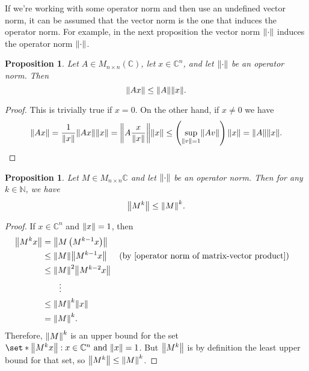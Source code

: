 \documentclass[12pt]{article}
\newtheorem{prop}[thm]{Proposition}
\theoremstyle{definition}
\newcommand{\N}{\mathbb N}
\newcommand{\C}{\mathbb C}
\DeclarePairedDelimiter\norm{\lVert}{\rVert}
\begin{document}
If we're working with some operator norm and then use an undefined vector norm, it can be assumed that the vector norm is the one that induces the operator norm. For example, in the next proposition the vector norm $\norm{\cdot}$ induces the operator norm $\norm{\cdot}$.

\begin{prop}\label{operator norm of matrix-vector product}
Let $A \in M_{n \times n}(\C)$, let $x \in \C^n$, and let $\norm{\cdot}$ be an operator norm. Then $$\norm*{Ax} \leq \norm*{A}\norm*{x}.$$
\end{prop}
\begin{proof}
This is trivially true if $x = 0$. On the other hand, if $x \neq 0$ we have
$$
\norm*{Ax} 
= \frac{1}{\norm{x}} \norm*{Ax} \norm*{x}
= \norm*{A \frac{x}{\norm{x}}} \norm*{x}
\leq \left( \sup_{\norm{v} = 1} \norm{A v} \right) \norm{x}
= \norm{A} \norm{x}.
$$
\end{proof}

\begin{prop}\label{operator norm of matrix power}
Let $M \in M_{n \times n} \C$ and let $\norm{\cdot}$ be an operator norm. Then for any $k \in \N$, we have $$\norm*{M^k} \leq \norm*{M}^k.$$
\end{prop}
\begin{proof}
If $x \in \C^n$ and $\norm{x} = 1$, then
\begin{align*}
\norm*{M^k x} &= \norm*{M\left( M^{k-1} x \right)} \\
&\leq \norm*{M} \norm*{M^{k-1} x} && \text{(by \cref{operator norm of matrix-vector product})} \\
&\leq \norm*{M}^2 \norm*{M^{k-2} x} \\
&\quad\quad \vdots \\
&\leq \norm*{M}^k \norm*{x} \\
&= \norm*{M}^k.
\end{align*}
Therefore, $\norm*{M}^k$ is an upper bound for the set $\set*{\norm*{M^k x} : x \in \C^n \text{ and } \norm{x} = 1}$. But $\norm*{M^k}$ is by definition the least upper bound for that set, so $\norm*{M^k} \leq \norm*{M}^k$.
\end{proof}
\end{document}
